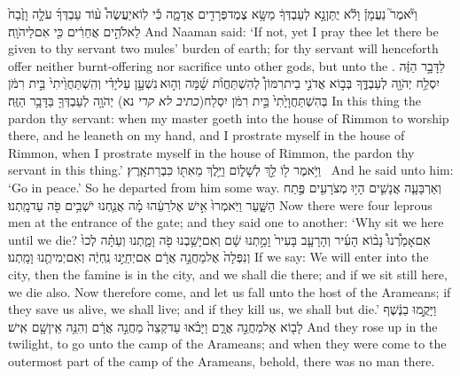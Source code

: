 {וַיֹּ֘אמֶר֮ נַעֲמָן֒ וָלֹ֕א יֻתַּן\maqqaf נָ֣א לְעַבְדְּךָ֔ מַשָּׂ֥א צֶמֶד\maqqaf פְּרָדִ֖ים אֲדָמָ֑ה כִּ֡י לֽוֹא\maqqaf יַעֲשֶׂה֩ ע֨וֹד עַבְדְּךָ֜ עֹלָ֤ה וָזֶ֙בַח֙ לֵאלֹהִ֣ים אֲחֵרִ֔ים כִּ֖י אִם\maqqaf לַיהֹוָֽה׃}
{And Naaman said: ‘If not, yet I pray thee let there be given to thy servant two mules’ burden of earth; for thy servant will henceforth offer neither burnt-offering nor sacrifice unto other gods, but unto the \lord.}
{לַדָּבָ֣ר הַזֶּ֔ה יִסְלַ֥ח יְהֹוָ֖ה לְעַבְדֶּ֑ךָ בְּב֣וֹא אֲדֹנִ֣י בֵית\maqqaf רִמּוֹן֩ לְהִשְׁתַּחֲוֺ֨ת שָׁ֜מָּה וְה֣וּא \legarmeh  נִשְׁעָ֣ן עַל\maqqaf יָדִ֗י וְהִֽשְׁתַּחֲוֵ֙יתִי֙ בֵּ֣ית רִמֹּ֔ן בְּהִשְׁתַּחֲוָיָ֙תִי֙ בֵּ֣ית רִמֹּ֔ן יִסְלַח(\textit{כתיב לא קרי} נא\maqqaf) יְהֹוָ֥ה לְעַבְדְּךָ֖ בַּדָּבָ֥ר הַזֶּֽה׃}
{In this thing the \lord\space pardon thy servant: when my master goeth into the house of Rimmon to worship there, and he leaneth on my hand, and I prostrate myself in the house of Rimmon, when I prostrate myself in the house of Rimmon, the \lord\space pardon thy servant in this thing.’}
{וַיֹּ֥אמֶר ל֖וֹ לֵ֣ךְ לְשָׁל֑וֹם וַיֵּ֥לֶךְ מֵאִתּ֖וֹ כִּבְרַת\maqqaf אָֽרֶץ׃ \setuma }
{And he said unto him: ‘Go in peace.’ So he departed from him some way.}
\newperek
{}
\label{haft_28}
\setcounter{chap}{7}
\setcounter{verse}{3}
{וְאַרְבָּעָ֧ה אֲנָשִׁ֛ים הָי֥וּ מְצֹרָעִ֖ים פֶּ֣תַח הַשָּׁ֑עַר וַיֹּֽאמְרוּ֙ אִ֣ישׁ אֶל\maqqaf רֵעֵ֔הוּ מָ֗ה אֲנַ֛חְנוּ יֹשְׁבִ֥ים פֹּ֖ה עַד\maqqaf מָֽתְנוּ׃}
{Now there were four leprous men at the entrance of the gate; and they said one to another: ‘Why sit we here until we die?}
{אִם\maqqaf אָמַ֩רְנוּ֩ נָב֨וֹא הָעִ֜יר וְהָרָעָ֤ב בָּעִיר֙ וָמַ֣תְנוּ שָׁ֔ם וְאִם\maqqaf יָשַׁ֥בְנוּ פֹ֖ה וָמָ֑תְנוּ וְעַתָּ֗ה לְכוּ֙ וְנִפְּלָה֙ אֶל\maqqaf מַחֲנֵ֣ה אֲרָ֔ם אִם\maqqaf יְחַיֻּ֣נוּ נִֽחְיֶ֔ה וְאִם\maqqaf יְמִיתֻ֖נוּ וָמָֽתְנוּ׃}
{If we say: We will enter into the city, then the famine is in the city, and we shall die there; and if we sit still here, we die also. Now therefore come, and let us fall unto the host of the Arameans; if they save us alive, we shall live; and if they kill us, we shall but die.’}
{וַיָּקֻ֣מוּ בַנֶּ֔שֶׁף לָב֖וֹא אֶל\maqqaf מַחֲנֵ֣ה אֲרָ֑ם וַיָּבֹ֗אוּ עַד\maqqaf קְצֵה֙ מַחֲנֵ֣ה אֲרָ֔ם וְהִנֵּ֥ה אֵֽין\maqqaf שָׁ֖ם אִֽישׁ׃}
{And they rose up in the twilight, to go unto the camp of the Arameans; and when they were come to the outermost part of the camp of the Arameans, behold, there was no man there.}
